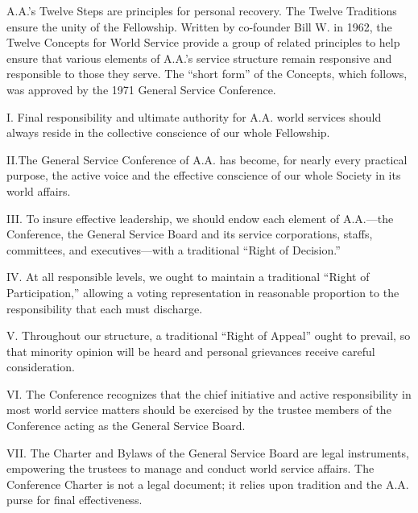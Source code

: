 


\begin{biblechapter}
    A.A.’s Twelve Steps are principles for personal recovery.
\verse The Twelve Traditions ensure the unity of the Fellowship.
\verse Written by co-founder Bill W. in 1962, 
    the Twelve Concepts for World Service 
    provide a group of related principles 
    to help ensure that various elements of A.A.’s service structure 
    remain responsive and responsible to those they serve.
The “short form” of the Concepts, which follows, was approved by the 1971 General Service Conference.
\end{biblechapter}


\begin{biblechapter}
I. Final responsibility 
    and ultimate authority 
    for A.A. world services 
    should always reside in the collective conscience 
    of our whole Fellowship.

\verse II.The General Service Conference of A.A. has become,
    for nearly every practical purpose, 
    the active voice and the effective conscience 
    of our whole Society in its world affairs.

\verse III. To insure effective leadership, 
    we should endow each element of A.A.—the 
    Conference, the General Service Board 
    and its service corporations, staffs, committees,
    and executives—with a traditional “Right of Decision.”

\verse IV. At all responsible levels, 
    we ought to maintain a traditional “Right of Participation,” 
    allowing a voting representation in reasonable proportion 
    to the responsibility that each must discharge.

\verse V. Throughout our structure, 
    a traditional “Right of Appeal” ought to prevail, 
    so that minority opinion will be heard 
    and personal grievances receive careful consideration.

\verse VI. The Conference recognizes that the chief initiative 
    and active responsibility in most world service matters
    should be exercised by the trustee members of the Conference 
    acting as the General Service Board.

\verse VII. The Charter and Bylaws of the General Service Board 
    are legal instruments, 
    empowering the trustees to manage and conduct world service affairs.
    The Conference Charter is not a legal document; 
    it relies upon tradition and the A.A. purse for final effectiveness.


\end{biblechapter}
